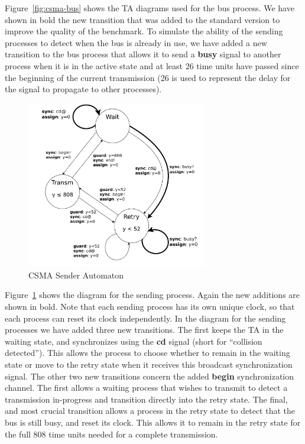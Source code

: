 \documentclass[a4paper,11pt]{report}
\theoremstyle{definition}
\begin{document}
Figure~\ref{fig:csma-bus} shows the TA diagrams used for the bus process. We have shown in
bold the new transition that was added to the standard version to improve the
quality of the benchmark. To simulate the ability of the sending processes to
detect when the bus is already in use, we have added a new transition to the bus
process that allows it to send a \textbf{busy} signal to another process when it
is in the active state and at least 26 time units have passed since the
beginning of the current transmission (26 is used to represent the delay for the
signal to propagate to other processes).

\begin{figure}[h]
  \centering
  \includegraphics[width=0.7\textwidth]{csma-sender}
  \caption{CSMA Sender Automaton}
  \label{fig:csma-sender}
\end{figure}

Figure~\ref{fig:csma-sender} shows the diagram for the sending process. Again
the new additions are shown in bold. Note that each sending process has its own
unique clock, so that each process can reset its clock independently. In the
diagram for the sending processes we have added three new transitions. The first
keeps the TA in the waiting state, and synchronizes using the \textbf{cd} signal
(short for ``collision detected''). This allows the process to choose whether to
remain in the waiting state or move to the retry state when it receives this
broadcast synchronization signal. The other two new transitions concern the
added \textbf{begin} synchronization channel. The first allows a waiting process
that wishes to transmit to detect a transmission in-progress and transition
directly into the retry state. The final, and most crucial transition allows a
process in the retry state to detect that the bus is still busy, and reset its
clock. This allows it to remain in the retry state for the full 808 time units
needed for a complete transmission.
\end{document}
